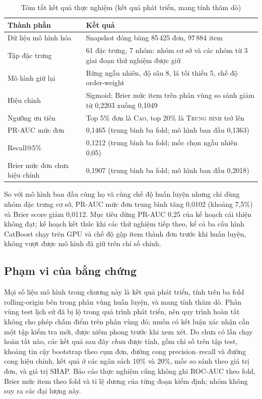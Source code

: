 \begin{table}[htbp]\centering\small
\caption{Tóm tắt kết quả thực nghiệm (kết quả phát triển, mang tính thăm dò)}\label{tab:res-summary}
\begin{tabular}{p{3.6cm}p{9.9cm}}
\toprule
Thành phần & Kết quả \\
\midrule
Dữ liệu mô hình hóa & Snapshot đóng băng 85\,425 đơn, 97\,884 item \\
Tập đặc trưng & 61 đặc trưng, 7 nhóm: nhóm cơ sở và các nhóm từ 3 giai đoạn thử nghiệm được giữ \\
Mô hình giữ lại & Rừng ngẫu nhiên, độ sâu 8, lá tối thiểu 5, chế độ order-weight \\
Hiệu chỉnh & Sigmoid; Brier mức item trên phân vùng so sánh giảm từ 0,2203 xuống 0,1049 \\
Ngưỡng ưu tiên & Top 5\% đơn là \textsc{Cao}, top 20\% là \textsc{Trung bình} trở lên \\
PR-AUC mức đơn & 0,1465 (trung bình ba fold; mô hình ban đầu 0,1363) \\
Recall@5\% & 0,1212 (trung bình ba fold; mốc chọn ngẫu nhiên 0,05) \\
Brier mức đơn chưa hiệu chỉnh & 0,1907 (trung bình ba fold; mô hình ban đầu 0,2018) \\
\bottomrule
\end{tabular}
\end{table}

So với mô hình ban đầu cùng họ và cùng chế độ huấn luyện nhưng chỉ dùng nhóm đặc trưng cơ sở, PR-AUC mức đơn trung bình tăng 0,0102 (khoảng 7,5\%) và Brier score giảm 0,0112. Mục tiêu dừng PR-AUC 0,25 của kế hoạch cải thiện không đạt; kế hoạch kết thúc khi các thử nghiệm tiếp theo, kể cả ba cấu hình CatBoost chạy trên GPU và chế độ gộp item thành đơn trước khi huấn luyện, không vượt được mô hình đã giữ trên chỉ số chính.

\subsection{Phạm vi của bằng chứng}\label{subsec:res-scope}

Mọi số liệu mô hình trong chương này là kết quả phát triển, tính trên ba fold rolling-origin bên trong phân vùng huấn luyện, và mang tính thăm dò. Phân vùng test lịch sử đã bị lộ trong quá trình phát triển, nên quy trình hoàn tất không cho phép chấm điểm trên phân vùng đó; muốn có kết luận xác nhận cần một tập kiểm tra mới, được niêm phong trước khi xem xét. Do chưa có lần chạy hoàn tất nào, các kết quả sau đây \emph{chưa} được tính, gồm chỉ số trên tập test, khoảng tin cậy bootstrap theo cụm đơn, đường cong precision--recall và đường cong hiệu chỉnh, kết quả ở các ngân sách 10\% và 20\%, mốc so sánh theo giá trị đơn, và giá trị SHAP. Báo cáo thực nghiệm cũng không ghi ROC-AUC theo fold, Brier mức item theo fold và tỉ lệ dương của từng đoạn kiểm định; nhóm không suy ra các đại lượng này.

